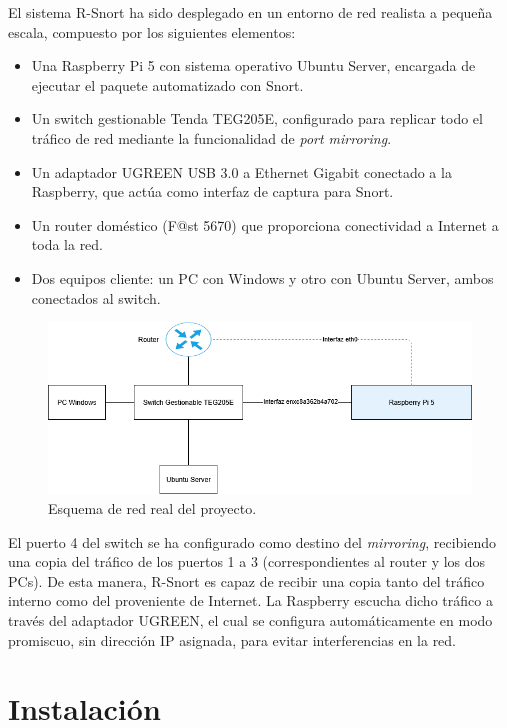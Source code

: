 \documentclass[11pt,a4paper,twoside]{report}
\begin{document}
El sistema R-Snort ha sido desplegado en un entorno de red realista a pequeña escala, compuesto por los siguientes elementos:

\begin{itemize}
	\item Una Raspberry Pi 5 con sistema operativo Ubuntu Server, encargada de ejecutar el paquete automatizado con Snort.
	\item Un switch gestionable Tenda TEG205E, configurado para replicar todo el tráfico de red mediante la funcionalidad de \textit{port mirroring}.
	\item Un adaptador UGREEN USB 3.0 a Ethernet Gigabit conectado a la Raspberry, que actúa como interfaz de captura para Snort.
	\item Un router doméstico (F@st 5670) que proporciona conectividad a Internet a toda la red.
	\item Dos equipos cliente: un PC con Windows y otro con Ubuntu Server, ambos conectados al switch.
\end{itemize}

\begin{figure}[H]
	\centering
	\includegraphics[scale=0.6]{script_automatico/network.png}
	\caption{Esquema de red real del proyecto.}
\end{figure}

El puerto 4 del switch se ha configurado como destino del \textit{mirroring}, recibiendo una copia del tráfico de los puertos 1 a 3 (correspondientes al router y los dos PCs). De esta manera, R-Snort es capaz de recibir una copia tanto del tráfico interno como del proveniente de Internet. La Raspberry escucha dicho tráfico a través del adaptador UGREEN, el cual se configura automáticamente en modo promiscuo, sin dirección IP asignada, para evitar interferencias en la red.

\section{Instalación}
\end{document}
